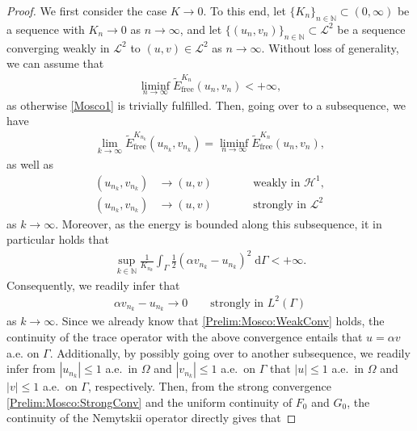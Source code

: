 \documentclass[10pt,a4paper]{amsart}
\newcommand{\Ga}{\Gamma}
\newcommand{\N}{\mathbb N}
\newcommand{\Om}{\Omega}
\newcommand{\abs}[1]{|#1|}
\newcommand{\dG}{\;\mathrm d\Ga}
\newcommand{\free}{\mathrm{free}}
\newcommand{\intG}{\int_\Gamma}
\begin{document}
\begin{proof}
    We first consider the case $K\rightarrow 0$. To this end, let $\{K_n\}_{n\in\N}\subset(0,\infty)$ be a sequence with $K_n\rightarrow 0$ as $n\rightarrow\infty$, and let $\{(u_n,v_n)\}_{n\in\N}\subset\mathcal{L}^2$ be a sequence converging weakly in $\mathcal{L}^2$ to $(u,v)\in\mathcal{L}^2$ as $n\rightarrow\infty$. Without loss of generality, we can assume that 
    \begin{align*}
        \liminf_{n\rightarrow\infty} \widetilde E_\free^{K_n}(u_n,v_n) < + \infty,
    \end{align*}
    as otherwise \ref{Mosco1} is trivially fulfilled. Then, going over to a subsequence, we have 
    \begin{align*}
        \lim_{k\rightarrow\infty} \widetilde E_\free^{K_{n_k}}(u_{n_k},v_{n_k}) = \liminf_{n\rightarrow\infty} \widetilde E_\free^{K_n}(u_n,v_n),
    \end{align*}
    as well as
    \begin{subequations}
        \begin{alignat}{2}
            (u_{n_k},v_{n_k}) &\rightarrow (u,v) &&\qquad\text{weakly in~}\mathcal{H}^1, \label{Prelim:Mosco:WeakConv} \\
            (u_{n_k},v_{n_k}) &\rightarrow (u,v) &&\qquad \text{strongly in~}\mathcal{L}^2 \label{Prelim:Mosco:StrongConv}
        \end{alignat}
    \end{subequations}
    as $k\rightarrow\infty$. Moreover, as the energy is bounded along this subsequence, it in particular holds that
    \begin{align}
        \sup_{k\in\N} \frac{1}{K_{n_k}}\intG \frac12(\alpha v_{n_k} - u_{n_k})^2\dG < +\infty.
    \end{align}
    Consequently, we readily infer that
    \begin{align*}
        \alpha v_{n_k} - u_{n_k} \rightarrow 0 \qquad\text{strongly in~}L^2(\Ga)
    \end{align*}
    as $k\rightarrow\infty$. Since we already know that \eqref{Prelim:Mosco:WeakConv} holds, the continuity of the trace operator with the above convergence entails that $u = \alpha v$ a.e. on $\Ga$. Additionally, by possibly going over to another subsequence, we readily infer from $\abs{u_{n_k}}\leq 1$ a.e.~in $\Om$ and $\abs{v_{n_k}}\leq 1$ a.e.~on $\Ga$ that $\abs{u}\leq 1$ a.e.~in $\Om$ and $\abs{v}\leq 1$ a.e.~on $\Ga$, respectively. Then, from the strong convergence \eqref{Prelim:Mosco:StrongConv} and the uniform continuity of $F_0$ and $G_0$, the continuity of the Nemytskii operator directly gives that

\end{proof}
\end{document}
